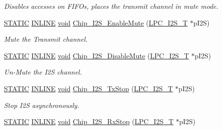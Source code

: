 \begin{DoxyCompactItemize}
\begin{DoxyCompactList}\small\item\em Disables accesses on F\-I\-F\-Os, places the transmit channel in mute mode. \end{DoxyCompactList}\item 
\hyperlink{group__LPC__Types__Public__Macros_ga10b2d890d871e1489bb02b7e70d9bdfb}{S\-T\-A\-T\-I\-C} \hyperlink{group__LPC__Types__Public__Types_ga2eb6f9e0395b47b8d5e3eeae4fe0c116}{I\-N\-L\-I\-N\-E} \hyperlink{Paradigm_2Tern__EE_2small_2portmacro_8h_a14d32f8130d3c0b212cfc751730b5b49}{void} \hyperlink{group__I2S__17XX__40XX_ga3977adf6afb42ea9da7c764ef36efa6e}{Chip\-\_\-\-I2\-S\-\_\-\-Enable\-Mute} (\hyperlink{structLPC__I2S__T}{L\-P\-C\-\_\-\-I2\-S\-\_\-\-T} $\ast$p\-I2\-S)
\begin{DoxyCompactList}\small\item\em Mute the Transmit channel. \end{DoxyCompactList}\item 
\hyperlink{group__LPC__Types__Public__Macros_ga10b2d890d871e1489bb02b7e70d9bdfb}{S\-T\-A\-T\-I\-C} \hyperlink{group__LPC__Types__Public__Types_ga2eb6f9e0395b47b8d5e3eeae4fe0c116}{I\-N\-L\-I\-N\-E} \hyperlink{Paradigm_2Tern__EE_2small_2portmacro_8h_a14d32f8130d3c0b212cfc751730b5b49}{void} \hyperlink{group__I2S__17XX__40XX_ga0c6731695f685fa21678ea3635b458f3}{Chip\-\_\-\-I2\-S\-\_\-\-Disable\-Mute} (\hyperlink{structLPC__I2S__T}{L\-P\-C\-\_\-\-I2\-S\-\_\-\-T} $\ast$p\-I2\-S)
\begin{DoxyCompactList}\small\item\em Un-\/\-Mute the I2\-S channel. \end{DoxyCompactList}\item 
\hyperlink{group__LPC__Types__Public__Macros_ga10b2d890d871e1489bb02b7e70d9bdfb}{S\-T\-A\-T\-I\-C} \hyperlink{group__LPC__Types__Public__Types_ga2eb6f9e0395b47b8d5e3eeae4fe0c116}{I\-N\-L\-I\-N\-E} \hyperlink{Paradigm_2Tern__EE_2small_2portmacro_8h_a14d32f8130d3c0b212cfc751730b5b49}{void} \hyperlink{group__I2S__17XX__40XX_gac7d296f84ba3283e63861515d134edfe}{Chip\-\_\-\-I2\-S\-\_\-\-Tx\-Stop} (\hyperlink{structLPC__I2S__T}{L\-P\-C\-\_\-\-I2\-S\-\_\-\-T} $\ast$p\-I2\-S)
\begin{DoxyCompactList}\small\item\em Stop I2\-S asynchronously. \end{DoxyCompactList}\item 
\hyperlink{group__LPC__Types__Public__Macros_ga10b2d890d871e1489bb02b7e70d9bdfb}{S\-T\-A\-T\-I\-C} \hyperlink{group__LPC__Types__Public__Types_ga2eb6f9e0395b47b8d5e3eeae4fe0c116}{I\-N\-L\-I\-N\-E} \hyperlink{Paradigm_2Tern__EE_2small_2portmacro_8h_a14d32f8130d3c0b212cfc751730b5b49}{void} \hyperlink{group__I2S__17XX__40XX_gaa78f387af78de456819cec21bbf21ada}{Chip\-\_\-\-I2\-S\-\_\-\-Rx\-Stop} (\hyperlink{structLPC__I2S__T}{L\-P\-C\-\_\-\-I2\-S\-\_\-\-T} $\ast$p\-I2\-S)

\end{DoxyCompactItemize}
